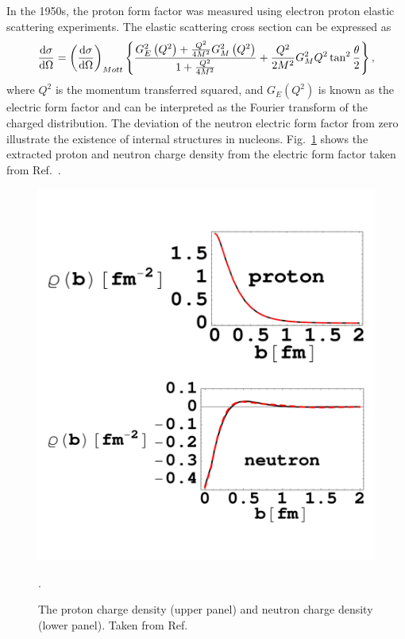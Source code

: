 In the 1950s, the proton form factor was measured using electron proton elastic
scattering experiments\cite{hofstadter1956}. The elastic scattering cross 
section can be expressed as 
\begin{equation}
\dv{\sigma}{\Omega} = \left(\dv{\sigma}{\Omega}\right)_{Mott}\left\{ 
	\frac{G_E^2\left(Q^2\right) + \frac{Q^2}{4M^2}G_M^2 \left(Q^2\right)}
	{1 + \frac{Q^2}{4M^2}} + \frac{Q^2}{2M^2} G^2_M{Q^2}\tan^2\frac{\theta}{2}
	\right\},
\end{equation}
where $Q^2$ is the momentum transferred squared, and $G_E\left(Q^2\right)$ is 
known as the electric form factor and can be interpreted as the Fourier 
transform of the charged distribution. The deviation of the neutron electric 
form factor from zero illustrate the existence of internal structures in 
nucleons. Fig.\ \ref{fig:charge} shows the extracted proton and neutron charge 
density from the electric form factor taken from Ref.\ \cite{miller2007}.
\begin{figure}[htbp!]
    \centering
    \includegraphics[width=0.5\linewidth]{./images/charge_distribution}
    \caption{The proton charge density (upper panel) and neutron charge density
	(lower panel). Taken from Ref.\ \cite{miller2007}}.
    \label{fig:charge}
\end{figure}


